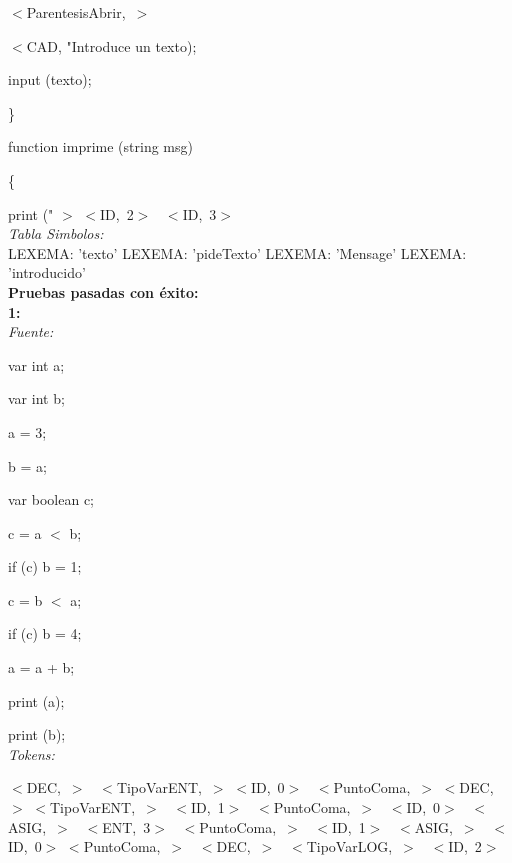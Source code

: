 \documentclass[a4paper, 12pt]{article}
\begin{document}
 \noindent
 \mbox{$<$ParentesisAbrir, $>$ }
 
 \noindent
$<$CAD, "\textnormal{Introduce un texto);} 
 
	input (texto);
	
\} 

\textnormal{function imprime (string msg)}

\{ 

	print (" $>$
\mbox{$<$ID, 2$>$ }
\mbox{$<$ID, 3$>$}\medskip\\
\emph{Tabla Simbolos:}\\
  LEXEMA: 'texto'
  LEXEMA: 'pideTexto'
  LEXEMA: 'Mensage'
  LEXEMA: 'introducido'\bigskip \\
\textbf{Pruebas pasadas con éxito:}\medskip\\
\textbf{1:}\smallskip\\
\emph{Fuente:} \smallskip


var int a;
 
var int b;

a = 3;

b = a;

 var boolean c;
 
c = a  $<$  b;

if (c) b  =  1;

c = b  $<$  a;

if (c) b  =  4;

 a = a  +  b;
 
print (a);

print (b);\medskip \\
\emph{Tokens:}

\smallskip
\noindent 
\mbox{$<$DEC, $>$ }
\mbox{$<$TipoVarENT, $>$} 
\mbox{$<$ID, 0$>$ }
\mbox{$<$PuntoComa, $>$} 
\mbox{$<$DEC, $>$}
\mbox{$<$TipoVarENT, $>$ }
\mbox{$<$ID, 1$>$ }
\mbox{$<$PuntoComa, $>$ }
\mbox{$<$ID, 0$>$ }
\mbox{$<$ASIG, $>$ }
\mbox{$<$ENT, 3$>$ }
\mbox{$<$PuntoComa, $>$ }
\mbox{$<$ID, 1$>$ }
\mbox{$<$ASIG, $>$ }
\mbox{$<$ID, 0$>$} 
\mbox{$<$PuntoComa, $>$ }
\mbox{$<$DEC, $>$ }
\mbox{$<$TipoVarLOG, $>$ }
\mbox{$<$ID, 2$>$ }
\end{document}
